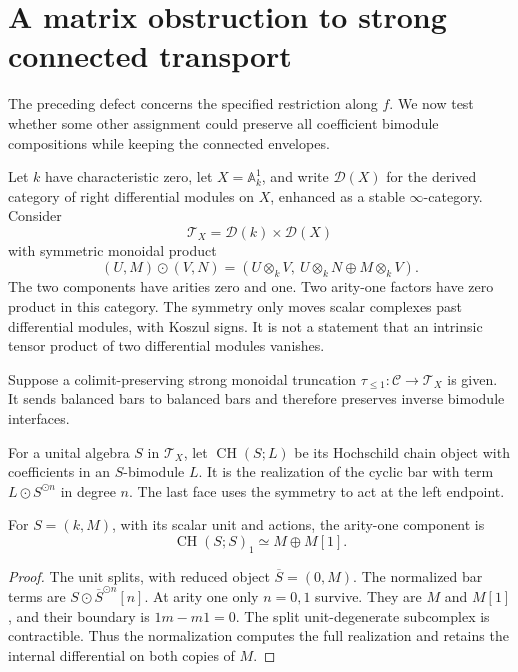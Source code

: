 \section{A matrix obstruction to strong connected transport}
\label{v4-sec:connected-Morita-obstruction}

The preceding defect concerns the specified restriction along \(f\).
We now test whether some other assignment could preserve all
coefficient bimodule compositions while keeping the connected
envelopes.

Let \(k\) have characteristic zero, let \(X=\mathbb A^1_k\), and
write \(\mathcal D(X)\) for the derived category of right differential
modules on \(X\), enhanced as a stable \(\infty\)-category.
Consider
\[
 \mathcal T_X=\mathcal D(k)\times\mathcal D(X)
\]
with symmetric monoidal product
\begin{equation}\label{v4-eq:square-zero-truncation}
 (U,M)\odot(V,N)
 =
 (U\otimes_k V,\ U\otimes_k N\oplus M\otimes_k V).
\end{equation}
The two components have arities zero and one. Two arity-one
factors have zero product in this category. The symmetry only
moves scalar complexes past differential modules, with Koszul signs.
It is not a statement that an intrinsic tensor product of two
differential modules vanishes.

Suppose a colimit-preserving strong monoidal truncation
\(\tau_{\leq1}:\mathcal C\to\mathcal T_X\) is given.
It sends balanced bars to balanced bars and therefore preserves
inverse bimodule interfaces.

For a unital algebra \(S\) in \(\mathcal T_X\), let
\(\operatorname{CH}(S;L)\) be its Hochschild chain object with
coefficients in an \(S\)-bimodule \(L\).
It is the realization of the cyclic bar with term
\(L\odot S^{\odot n}\) in degree \(n\). The last face uses the
symmetry to act at the left endpoint.

\begin{lemma}\label{v4-lem:singleton-chains}
For \(S=(k,M)\), with its scalar unit and actions, the arity-one
component is
\[
 \operatorname{CH}(S;S)_1\simeq M\oplus M[1].
\]
\end{lemma}

\begin{proof}
The unit splits, with reduced object \(\overline S=(0,M)\).
The normalized bar terms are
\(S\odot\overline S^{\odot n}[n]\).
At arity one only \(n=0,1\) survive. They are \(M\) and \(M[1]\),
and their boundary is \(1m-m1=0\).
The split unit-degenerate subcomplex is contractible. Thus the
normalization computes the full realization and retains the
internal differential on both copies of \(M\).
\end{proof}

